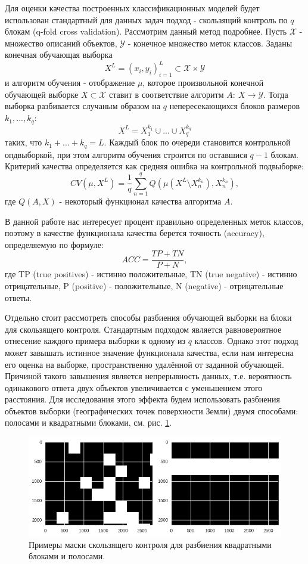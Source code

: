 \documentclass[14pt]{extarticle}
\begin{document}
\par
Для оценки качества построенных классификационных моделей будет использован стандартный
для данных задач подход - скользящий контроль по $q$ блокам (q-fold cross validation).
Рассмотрим данный метод подробнее. 
Пусть $\mathcal{X}$ - множество описаний объектов, 
$\mathcal{Y}$ - конечное множество меток классов. Заданы конечная обучающая выборка
\[
    X^L=(x_i, y_i)_{i=1}^L \subset \mathcal{X} \times \mathcal{Y} 
\]
и алгоритм обучения - отображение $\mu$, которое
произвольной конечной обучающей выборке $X \subset \mathcal{X}$
ставит в соответствие алгоритм $A:\ X \to \mathcal{Y}$.
Тогда выборка разбивается случаным образом на $q$ непересекающихся блоков размеров
$k_1,...,k_q$:
\[
    X^L=X_1^{k_1} \cup ... \cup X_q^{k_q}
\]
таких, что $k_1+...+k_q=L$. Каждый блок по очереди становится контрольной опдвыборкой,
при этом алгоритм обучения строится по оставшися $q-1$ блокам. Критерий качества
определяется как средняя ошибка на контрольной подвыборке:
\[
    CV(\mu, X^L)=\frac{1}{q}\sum_{n=1}^q Q(\mu(X^L \setminus X_n^{k_n}),X_n^{k_n}),
\]
где $Q(A, X)$ - некоторый функционал качества алгоритма $A$.
\par
В данной работе нас интересует процент правильно определенных меток классов,
поэтому в качестве функционала качества берется точность (accuracy),
определяемую по формуле:
\[
    ACC=\frac{TP+TN}{P+N},
\]
где TP (true positives) - истинно положительные, TN (true negative) - истинно отрицательные,
P (positive) - положительные, N (negative) - отрицательные ответы.
\par
Отдельно стоит рассмотреть способы разбиения обучающей выборки на блоки для скользящего
контроля. Стандартным подходом является равновероятное отнесение каждого примера выборки
к одному из $q$ классов. Однако этот подход может завышать истинное значение функционала
качества, если нам интересна его оценка на выборке, пространственно удалённой от заданной
обучающей. Причиной такого завышения является непрерывность данных, т.е. вероятность 
одинакового ответа двух объектов увеличивается с уменьшением этого расстояния.
Для исследования этого эффекта будем использовать разбиения объектов выборки
(географических точек поверхности Земли) двумя способами: полосами и квадратными блоками,
см. рис. \ref{image:val_masks}. 
\begin{figure}[H]
\centering
\includegraphics[width=\linewidth]{imgs/validation_masks.png}
\caption{Примеры маски скользящего контроля для разбиения квадратными блоками и полосами.}
\label{image:val_masks}
\end{figure}
\end{document}
